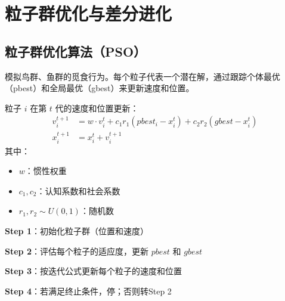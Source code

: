 \section{粒子群优化与差分进化}\label{sec:pso-de}

\subsection{粒子群优化算法（PSO）}

\begin{conceptbox}[PSO原理]
模拟鸟群、鱼群的觅食行为。每个粒子代表一个潜在解，通过跟踪个体最优（pbest）和全局最优（gbest）来更新速度和位置。
\end{conceptbox}

\begin{definition}[PSO迭代公式]
粒子 $i$ 在第 $t$ 代的速度和位置更新：
\begin{align*}
v_i^{t+1} &= w \cdot v_i^t + c_1 r_1 (pbest_i - x_i^t) + c_2 r_2 (gbest - x_i^t) \\
x_i^{t+1} &= x_i^t + v_i^{t+1}
\end{align*}
其中：
\begin{itemize}[itemsep=0.2em]
    \item $w$：惯性权重
    \item $c_1, c_2$：认知系数和社会系数
    \item $r_1, r_2 \sim U(0, 1)$：随机数
\end{itemize}
\end{definition}

\begin{algobox}[PSO算法]
\textbf{Step 1}：初始化粒子群（位置和速度）

\textbf{Step 2}：评估每个粒子的适应度，更新 $pbest$ 和 $gbest$

\textbf{Step 3}：按迭代公式更新每个粒子的速度和位置

\textbf{Step 4}：若满足终止条件，停；否则转Step 2
\end{algobox}

